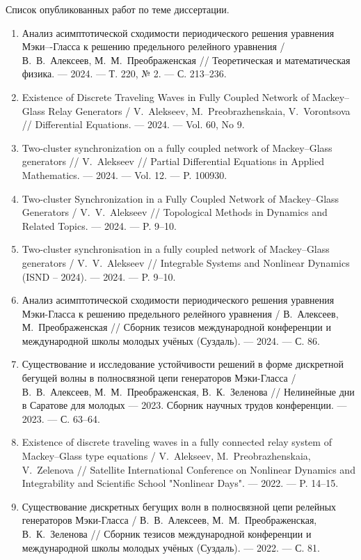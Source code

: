 Список опубликованных работ по теме диссертации.
\begin{enumerate}
	\item Анализ асимптотической сходимости периодического решения уравнения Мэки–-Гласса к решению предельного релейного уравнения / В.~В.~Алексеев, М.~М.~Преображенская // Теоретическая и математическая физика. --- 2024. --- Т. 220, № 2. --- С. 213--236. \cite{wosbib1}
	\item Existence of Discrete Traveling Waves in Fully Coupled Network of Mackey--Glass Relay Generators / V.~Alekseev, M.~Preobrazhenskaia, V.~Vorontsova // Differential Equations. --- 2024. --- Vol. 60, No 9. \cite{wosbib2}
	\item Two-cluster synchronization on a fully coupled network of Mackey--Glass generators // V.~Alekseev // Partial Differential Equations in Applied Mathematics. --- 2024. --- Vol. 12. --- P. 100930. \cite{scbib1}
	\item Two-cluster Synchronization in a Fully Coupled Network of	Mackey--Glass Generators / V.~V.~Alekseev // Topological Methods in Dynamics and Related Topics. --- 2024. --- P. 9--10. \cite{confbib6}
	\item Two-cluster synchronisation in a fully coupled network of	Mackey--Glass generators / V.~V.~Alekseev // Integrable Systems and Nonlinear Dynamics (ISND -- 2024). --- 2024. --- P. 9--10. \cite{confbib5}
	\item Анализ асимптотической сходимости периодического решения уравнения Мэки-Гласса к решению предельного релейного уравнения	/ В.~Алексеев, М.~Преображенская // Сборник тезисов международной конференции и международной школы молодых учёных (Суздаль). --- 2024. --- С. 86. \cite{confbib3}
	\item Существование и исследование устойчивости решений в форме дискретной бегущей волны в полносвязной цепи генераторов	Мэки-Гласса / В.~В.~Алексеев, М.~М.~Преображенская, В.~К.~Зеленова // Нелинейные дни в Саратове для молодых --- 2023. Сборник научных трудов конференции. --- 2023. --- С. 63--64. \cite{confbib2}
	\item Existence of discrete traveling waves in a fully connected relay system of Mackey–Glass type equations / V.~Alekseev, M.~Preobrazhenskaia, V.~Zelenova // Satellite International Conference on Nonlinear Dynamics and Integrability and Scientific School "Nonlinear Days". --- 2022. --- P. 14--15. \cite{confbib4}
	\item Существование дискретных бегущих волн в полносвязной цепи релейных генераторов Мэки-Гласса / В.~В.~Алексеев, М.~М.~Преображенская, В.~К.~Зеленова // Сборник тезисов международной конференции и международной школы молодых учёных (Суздаль). --- 2022. --- С. 81. \cite{confbib1}
\end{enumerate}

